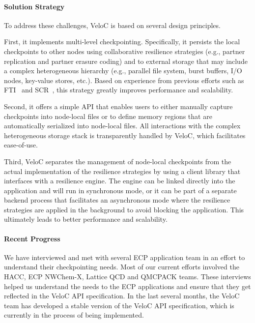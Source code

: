 \paragraph{Solution Strategy}

To address these challenges, VeloC is based on several design principles.

First, it implements multi-level checkpointing. Specifically, it
persists the local checkpoints to other nodes using collaborative
resilience strategies (e.g., partner replication and partner erasure
coding) and to external storage that may include a complex
heterogeneous hierarchy (e.g., parallel file system, burst buffers,
I/O nodes, key-value stores, etc.). Based on experience from previous
efforts such as FTI~\cite{FTI} and SCR~\cite{SCR}, this strategy
greatly improves performance and scalability.

Second, it offers a simple API that enables users to either manually
capture checkpoints into node-local files or to define memory regions
that are automatically serialized into node-local files. All interactions
with the complex heterogeneous storage stack is transparently handled
by VeloC, which facilitates ease-of-use.

Third, VeloC separates the management of node-local checkpoints
from the actual implementation of the resilience strategies by
using a client library that interfaces with a resilience engine.
The engine can be linked directly into the application and will
run in synchronous mode, or it can be part of a separate backend
process that facilitates an asynchronous mode where the resilience
strategies are applied in the background to avoid blocking the
application. This ultimately leads to better performance and scalability.

\paragraph{Recent Progress}

We have interviewed and met with several ECP application team in an
effort to understand their checkpointing needs. Most of our current
efforts involved the HACC, ECP NWChem-X, Lattice QCD and QMCPACK
teams. These interviews helped us understand the needs to the ECP
applications and ensure that they get reflected in the VeloC API
specification. In the last several months, the VeloC team has
developed a stable version of the VeloC API specification, which is
currently in the process of being implemented.

